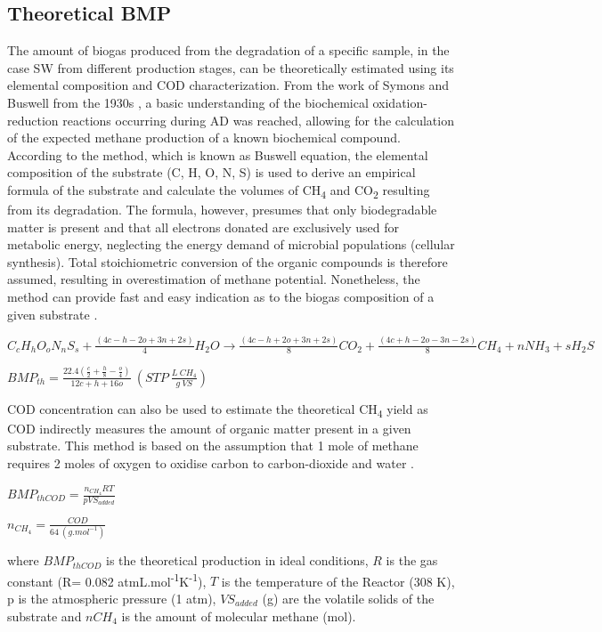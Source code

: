 \subsection{Theoretical BMP}
The amount of biogas produced from the degradation of a specific sample, in the case SW from different production stages, can be theoretically estimated using its elemental composition and COD characterization. From the work of Symons and Buswell from the 1930s \cite{Symons_1933}, a basic understanding of the biochemical oxidation-reduction reactions occurring during AD was reached, allowing for the calculation of the expected methane production of a known biochemical compound. According to the method, which is known as Buswell equation, the elemental composition of the substrate (C, H, O, N, S) is used to derive an empirical formula of the substrate and calculate the volumes of CH\textsubscript{4} and CO\textsubscript{2} resulting from its degradation. The formula, however, presumes that only biodegradable matter is present and that all electrons donated are exclusively used for metabolic energy, neglecting the energy demand of microbial populations (cellular synthesis)\cite{Labatut_2011,Lesteur_2010}. Total stoichiometric conversion of the organic compounds is therefore assumed, resulting in overestimation of methane potential. Nonetheless, the method can provide fast and easy indication as to the biogas composition of a given substrate \cite{Ware_2016}.

\(C_cH_hO_oN_nS_s+\frac{(4c-h-2o+3n+2s)}{4}H_2O→\frac{(4c-h+2o+3n+2s)}{8}CO_2+\frac{(4c+h-2o-3n-2s)}{8}CH_4+nNH_3+sH_2S\)

\(BMP_{th}=\frac{22.4\left(\frac{c}{2}+\frac{h}{8}-\frac{o}{4}\right)}{12c+h+16o}\ \left(STP\ \frac{L\ CH_4}{g\ VS}\right)\)

COD concentration can also be used to estimate the theoretical CH\textsubscript{4} yield as COD indirectly measures the amount of organic matter present in a given substrate. This method is based on the assumption that 1 mole of methane requires 2 moles of oxygen to oxidise carbon to carbon-dioxide and water \cite{Jingura_2017,Nielfa_2015}. 

\(BMP_{thCOD}=\frac{n_{CH_4}RT}{pVS_{added}}\)

\(n_{CH_4}=\frac{COD}{64\ \left(g.mol^{-1}\right)}\)

where $BMP_{thCOD}$ is the theoretical production in ideal conditions, $R$ is the gas constant (R= 0.082 atmL.mol\textsuperscript{-1}K\textsuperscript{-1}), $T$ is the temperature of the Reactor (308 K), p is the atmospheric pressure (1 atm), $VS_{added}$ (g) are the volatile solids of the substrate and $nCH_4$ is the amount of molecular methane (mol).

